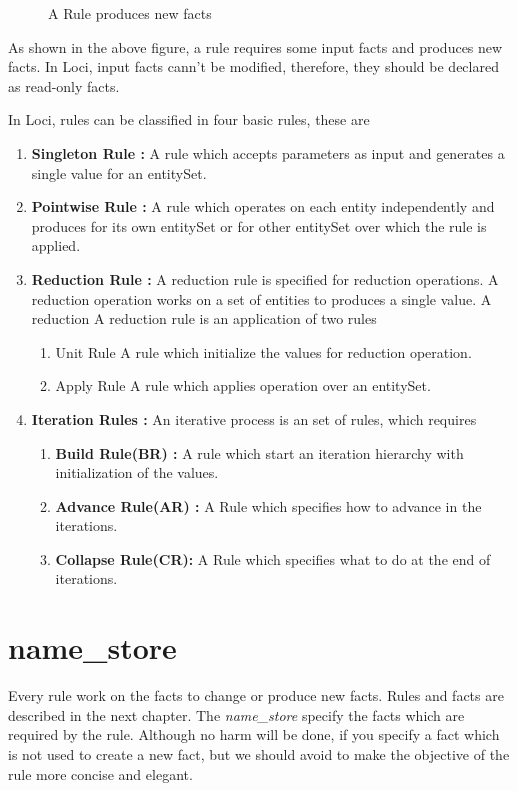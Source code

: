 \begin{figure}[h]
\vspace{2.50in}\caption { A Rule produces new facts }
\end{figure}

As shown in the above figure, a rule requires some input facts and 
produces new facts. In Loci, input facts cann't be modified, therefore,
they should be declared as read-only facts.

\par In Loci, rules can be classified in four basic rules, these are
\begin{enumerate}
\item {\bf Singleton Rule :} A rule which accepts parameters as input and 
generates a single value for an entitySet.
%
\item {\bf Pointwise Rule :}  A rule which operates on each entity independently and
produces for its own entitySet or for other entitySet over which the rule is applied.
%
\item {\bf Reduction Rule :}  A reduction rule is specified for reduction operations. 
A reduction operation works on a set of entities to produces a single value. A reduction
A reduction rule is an application of two rules
\begin{enumerate}
\item Unit Rule  A rule which initialize the values for reduction operation. 
\item Apply Rule A rule which applies operation over an entitySet.
\end{enumerate}
%
\item {\bf Iteration Rules :}  An iterative process is an set of rules, which requires
%
\begin{enumerate}
\item {\bf Build Rule(BR) :} A rule  which start an iteration hierarchy with initialization
of the values.
\item {\bf Advance Rule(AR) :} A Rule which specifies how to advance in the iterations.
\item {\bf Collapse Rule(CR):} A Rule which specifies what to do at the end of iterations.
\end{enumerate}
\end{enumerate}
%

\section {name\_store}
Every rule work on the facts to change or produce new facts. Rules and
facts are described in the next chapter. The {\em name\_store} specify the 
facts which are required by the rule. Although
no harm will be done, if you specify a fact which is not used to create
a new fact, but we should avoid to make the objective of the rule more
concise and elegant.

